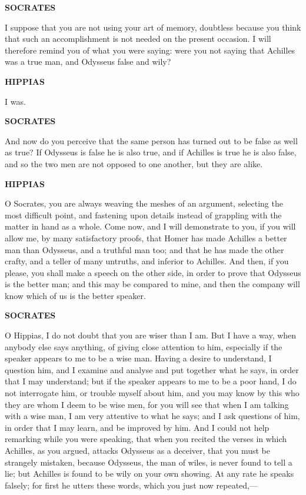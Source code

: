\documentclass[11pt,letter]{article}
\begin{document}
\par \textbf{SOCRATES}
\par   I suppose that you are not using your art of memory, doubtless because you think that such an accomplishment is not needed on the present occasion. I will therefore remind you of what you were saying:  were you not saying that Achilles was a true man, and Odysseus false and wily?

\par \textbf{HIPPIAS}
\par   I was.

\par \textbf{SOCRATES}
\par   And now do you perceive that the same person has turned out to be false as well as true? If Odysseus is false he is also true, and if Achilles is true he is also false, and so the two men are not opposed to one another, but they are alike.

\par \textbf{HIPPIAS}
\par   O Socrates, you are always weaving the meshes of an argument, selecting the most difficult point, and fastening upon details instead of grappling with the matter in hand as a whole. Come now, and I will demonstrate to you, if you will allow me, by many satisfactory proofs, that Homer has made Achilles a better man than Odysseus, and a truthful man too; and that he has made the other crafty, and a teller of many untruths, and inferior to Achilles. And then, if you please, you shall make a speech on the other side, in order to prove that Odysseus is the better man; and this may be compared to mine, and then the company will know which of us is the better speaker.

\par \textbf{SOCRATES}
\par   O Hippias, I do not doubt that you are wiser than I am. But I have a way, when anybody else says anything, of giving close attention to him, especially if the speaker appears to me to be a wise man. Having a desire to understand, I question him, and I examine and analyse and put together what he says, in order that I may understand; but if the speaker appears to me to be a poor hand, I do not interrogate him, or trouble myself about him, and you may know by this who they are whom I deem to be wise men, for you will see that when I am talking with a wise man, I am very attentive to what he says; and I ask questions of him, in order that I may learn, and be improved by him. And I could not help remarking while you were speaking, that when you recited the verses in which Achilles, as you argued, attacks Odysseus as a deceiver, that you must be strangely mistaken, because Odysseus, the man of wiles, is never found to tell a lie; but Achilles is found to be wily on your own showing. At any rate he speaks falsely; for first he utters these words, which you just now repeated,—
\end{document}
